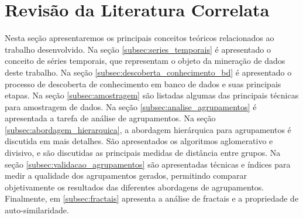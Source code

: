 \section{Revisão da Literatura Correlata} \label{sec:fundamentacao_teorica}

Nesta seção apresentaremos os principais conceitos teóricos relacionados ao
trabalho desenvolvido. Na seção \ref{subsec:series_temporais} é apresentado
o conceito de séries temporais, que representam o objeto da mineração de dados
deste trabalho. Na seção \ref{subsec:descoberta_conhecimento_bd} é
apresentado o processo de descoberta de conhecimento em banco de dados e
suas principais etapas. Na seção \ref{subsec:amostragem} são listadas
algumas das principais técnicas para amostragem de dados. Na seção
\ref{subsec:analise_agrupamentos} é apresentada a tarefa de análise de
agrupamentos. Na seção \ref{subsec:abordagem_hierarquica}, a abordagem
hierárquica para agrupamentos é discutida em mais detalhes. São apresentados os
algoritmos aglomerativo e divisivo, e são discutidas as principais medidas de
distância entre grupos. Na seção \ref{subsec:validacao_agrupamentos} são
apresentadas técnicas e índices para medir a qualidade dos agrupamentos gerados,
permitindo comparar objetivamente os resultados das diferentes abordagens de
agrupamentos. Finalmente, em \ref{subsec:fractais} apresenta a análise de
fractais e a propriedade de auto-similaridade.











